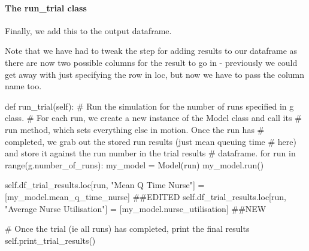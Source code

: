 \documentclass[
  letterpaper,
  DIV=11,
  numbers=noendperiod]{scrreprt}
\let\oldparagraph\paragraph
\renewcommand{\paragraph}[1]{\oldparagraph{#1}\mbox{}}
\newenvironment{Shaded}{\begin{snugshade}}{\end{snugshade}}
\newcommand{\BuiltInTok}[1]{\textcolor[rgb]{0.00,0.23,0.31}{#1}}
\newcommand{\CommentTok}[1]{\textcolor[rgb]{0.37,0.37,0.37}{#1}}
\newcommand{\ControlFlowTok}[1]{\textcolor[rgb]{0.00,0.23,0.31}{#1}}
\newcommand{\KeywordTok}[1]{\textcolor[rgb]{0.00,0.23,0.31}{#1}}
\newcommand{\NormalTok}[1]{\textcolor[rgb]{0.00,0.23,0.31}{#1}}
\newcommand{\OperatorTok}[1]{\textcolor[rgb]{0.37,0.37,0.37}{#1}}
\newcommand{\StringTok}[1]{\textcolor[rgb]{0.13,0.47,0.30}{#1}}
\newcommand{\VariableTok}[1]{\textcolor[rgb]{0.07,0.07,0.07}{#1}}
\begin{document}
\paragraph{The run\_trial class}\label{the-run_trial-class}

Finally, we add this to the output dataframe.

Note that we have had to tweak the step for adding results to our
dataframe as there are now two possible columns for the result to go in
- previously we could get away with just specifying the row in loc, but
now we have to pass the column name too.

\begin{Shaded}
\begin{Highlighting}[]
\KeywordTok{def}\NormalTok{ run\_trial(}\VariableTok{self}\NormalTok{):}
    \CommentTok{\# Run the simulation for the number of runs specified in g class.}
    \CommentTok{\# For each run, we create a new instance of the Model class and call its}
    \CommentTok{\# run method, which sets everything else in motion.  Once the run has}
    \CommentTok{\# completed, we grab out the stored run results (just mean queuing time}
    \CommentTok{\# here) and store it against the run number in the trial results}
    \CommentTok{\# dataframe.}
    \ControlFlowTok{for}\NormalTok{ run }\KeywordTok{in} \BuiltInTok{range}\NormalTok{(g.number\_of\_runs):}
\NormalTok{        my\_model }\OperatorTok{=}\NormalTok{ Model(run)}
\NormalTok{        my\_model.run()}

        \VariableTok{self}\NormalTok{.df\_trial\_results.loc[run, }\StringTok{"Mean Q Time Nurse"}\NormalTok{] }\OperatorTok{=}\NormalTok{ [my\_model.mean\_q\_time\_nurse] }\CommentTok{\#\#EDITED}
        \VariableTok{self}\NormalTok{.df\_trial\_results.loc[run, }\StringTok{"Average Nurse Utilisation"}\NormalTok{] }\OperatorTok{=}\NormalTok{ [my\_model.nurse\_utilisation] }\CommentTok{\#\#NEW}

    \CommentTok{\# Once the trial (ie all runs) has completed, print the final results}
    \VariableTok{self}\NormalTok{.print\_trial\_results()}
\end{Highlighting}
\end{Shaded}
\end{document}
